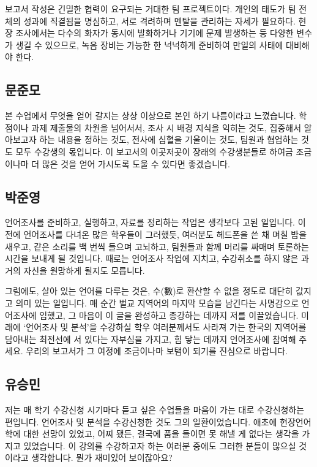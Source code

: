 보고서 작성은 긴밀한 협력이 요구되는 거대한 팀 프로젝트이다. 개인의 태도가 팀 전체의 성과에 직결됨을 명심하고, 서로 격려하며 멘탈을 관리하는 자세가 필요하다. 현장 조사에서는 다수의 화자가 동시에 발화하거나 기기에 문제 발생하는 등 다양한 변수가 생길 수 있으므로, 녹음 장비는 가능한 한 넉넉하게 준비하여 만일의 사태에 대비해야 한다.

\subsection{문준모}

본 수업에서 무엇을 얻어 갈지는 상상 이상으로 본인 하기 나름이라고 느꼈습니다. 학점이나 과제 제출물의 차원을 넘어서서, 조사 시 배경 지식을 익히는 것도, 집중해서 알아보고자 하는 내용을 정하는 것도, 전사에 심혈을 기울이는 것도, 팀원과 협업하는 것도 모두 수강생의 몫입니다. 이 보고서의 이곳저곳이 장래의 수강생분들로 하여금 조금이나마 더 많은 것을 얻어 가시도록 도울 수 있다면 좋겠습니다.

\subsection{박준영}

언어조사를 준비하고, 실행하고, 자료를 정리하는 작업은 생각보다 고된 일입니다. 이전에 언어조사를 다녀온 많은 학우들이 그러했듯, 여러분도 헤드폰을 쓴 채 며칠 밤을 새우고, 같은 소리를 백 번씩 들으며 고뇌하고, 팀원들과 함께 머리를 싸매며 토론하는 시간을 보내게 될 것입니다. 때로는 언어조사 작업에 지치고, 수강취소를 하지 않은 과거의 자신을 원망하게 될지도 모릅니다.

그럼에도, 살아 있는 언어를 다루는 것은, 수(數)로 환산할 수 없을 정도로 대단히 값지고 의미 있는 일입니다. 매 순간 벌교 지역어의 마지막 모습을 남긴다는 사명감으로 언어조사에 임했고, 그 마음이 이 글을 완성하고 종강하는 데까지 저를 이끌었습니다. 미래에 `언어조사 및 분석'을 수강하실 학우 여러분께서도 사라져 가는 한국의 지역어를 담아내는 최전선에 서 있다는 자부심을 가지고, 힘 닿는 데까지 언어조사에 참여해 주세요. 우리의 보고서가 그 여정에 조금이나마 보탬이 되기를 진심으로 바랍니다.

\subsection{유승민}

저는 매 학기 수강신청 시기마다 듣고 싶은 수업들을 마음이 가는 대로 수강신청하는 편입니다. 언어조사 및 분석을 수강신청한 것도 그의 일환이었습니다.  애초에 현장언어학에 대한 선망이 있었고, 어찌 됐든, 결국에 품을 들이면 못 해낼 게 없다는 생각을 가지고 있었습니다. 이 강의를 수강하고자 하는 여러분 중에도 그러한 분들이 많으실 것이라고 생각합니다. 뭔가 재미있어 보이잖아요? 

